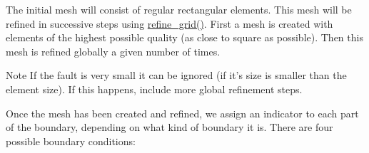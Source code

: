The initial mesh will consist of regular rectangular elements. This mesh will be refined in successive steps using \hyperlink{classvsf_1_1ApShear_ae0c1413d01e98526e4a61a7324bf2ae0}{refine\-\_\-grid()}. First a mesh is created with elements of the highest possible quality (as close to square as possible). Then this mesh is refined globally a given number of times.

\begin{DoxyNote}{Note}
If the fault is very small it can be ignored (if it's size is smaller than the element size). If this happens, include more global refinement steps. 
\end{DoxyNote}
Once the mesh has been created and refined, we assign an indicator to each part of the boundary, depending on what kind of boundary it is. There are four possible boundary conditions\-:



